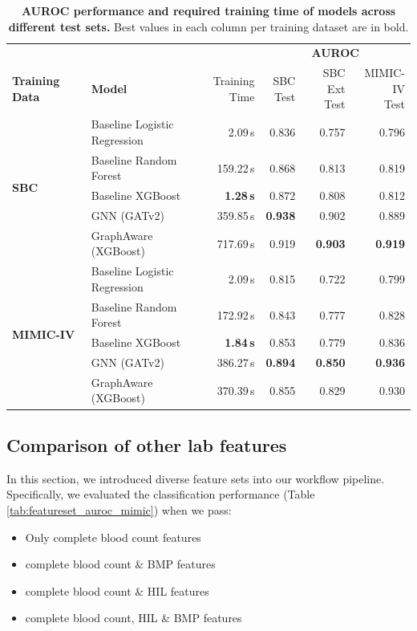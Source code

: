 \documentclass[pdflatex,sn-mathphys-num,lineno]{sn-jnl}
\theoremstyle{thmstyleone}%
\theoremstyle{thmstyletwo}%
\theoremstyle{thmstylethree}%
\begin{document}
\begin{table}[htbp]
    \centering
    \caption{\textbf{AUROC performance and required training time of models across different  
test sets.} Best values in each column per training dataset are in bold.}
    \label{tab:auroc_results}
    \small
    \begin{tabular}{llrrrr}
        \toprule
        & & & \multicolumn{3}{c}{\textbf{AUROC}} \\
        \cmidrule(lr){4-6}
        \textbf{Training Data} & \textbf{Model} & \thead{Training\\Time} & \thead{SBC\\Test} &
\thead{SBC Ext\\Test} & \thead{MIMIC-IV\\Test} \\
        \midrule
        \multirow{5}{*}{\textbf{SBC}} 
        & Baseline Logistic Regression   & 2.09\,s  & 0.836 & 0.757 & 0.796 \\
        & Baseline Random Forest          & 159.22\,s & 0.868 & 0.813 & 0.819 \\
        & Baseline XGBoost                & \textbf{1.28\,s} & 0.872 & 0.808 & 0.812 \\         
        & GNN (GATv2)                     & 359.85\,s & \textbf{0.938} & 0.902 & 0.889 \\       
        & GraphAware (XGBoost)            & 717.69\,s & 0.919 & \textbf{0.903} & \textbf{0.919} 
\\
        \midrule
        \multirow{5}{*}{\textbf{MIMIC-IV}} 
        & Baseline Logistic Regression   & 2.09\,s   & 0.815 & 0.722 & 0.799 \\
        & Baseline Random Forest          & 172.92\,s & 0.843 & 0.777 & 0.828 \\
        & Baseline XGBoost                & \textbf{1.84\,s} & 0.853 & 0.779 & 0.836 \\         
        & GNN (GATv2)                     & 386.27\,s & \textbf{0.894} & \textbf{0.850} &       
\textbf{0.936} \\
        & GraphAware (XGBoost)            & 370.39\,s & 0.855 & 0.829 & 0.930 \\
        \bottomrule
    \end{tabular}
\end{table}

\subsection{Comparison of other lab features}\label{res:labs}
In this section, we introduced diverse feature sets into our workflow pipeline. Specifically, we evaluated the classification performance (Table \ref{tab:featureset_auroc_mimic}) when we pass:
\begin{itemize}
    \item Only complete blood count features
    \item complete blood count \& BMP features
    \item complete blood count \& HIL features
    \item complete blood count, HIL \& BMP features
\end{itemize}
\end{document}
